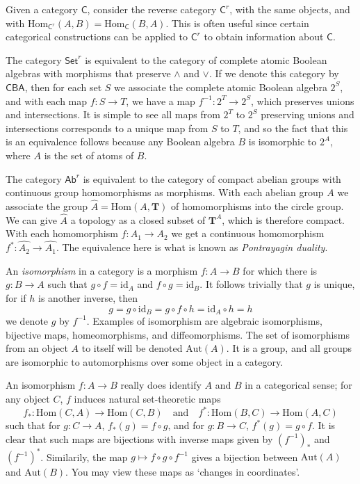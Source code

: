 Given a category $\mathsf{C}$, consider the reverse category $\mathsf{C}^{r}$, with the same objects, and with $\text{Hom}_{\mathsf{C}^r}(A,B) = \text{Hom}_{\mathsf{C}}(B,A)$. This is often useful since certain categorical constructions can be applied to $\mathsf{C}^r$ to obtain information about $\mathsf{C}$.

\begin{example}
    The category $\mathsf{Set}^r$ is equivalent to the category of complete atomic Boolean algebras with morphisms that preserve $\wedge$ and $\vee$. If we denote this category by $\mathsf{CBA}$, then for each set $S$ we associate the complete atomic Boolean algebra $2^S$, and with each map $f: S \to T$, we have a map $f^{-1}: 2^T \to 2^S$, which preserves unions and intersections. It is simple to see all maps from $2^T$ to $2^S$ preserving unions and intersections corresponds to a unique map from $S$ to $T$, and so the fact that this is an equivalence follows because any Boolean algebra $B$ is isomorphic to $2^A$, where $A$ is the set of atoms of $B$.
\end{example}

\begin{example}
    The category $\mathsf{Ab}^r$ is equivalent to the category of compact abelian groups with continuous group homomorphisms as morphisms. With each abelian group $A$ we associate the group $\widehat{A} = \text{Hom}(A,\mathbf{T})$ of homomorphisms into the circle group. We can give $\widehat{A}$ a topology as a closed subset of $\mathbf{T}^A$, which is therefore compact. With each homomorphism $f: A_1 \to A_2$ we get a continuous homomorphism $f^*: \widehat{A_2} \to \widehat{A_1}$. The equivalence here is what is known as \emph{Pontrayagin duality}.
\end{example}

An \emph{isomorphism} in a category is a morphism $f:A \to B$ for which there is $g: B \to A$ such that $g \circ f = \text{id}_A$ and $f \circ g = \text{id}_B$. It follows trivially that $g$ is unique, for if $h$ is another inverse, then
%
\[ g = g \circ \text{id}_B = g \circ f \circ h = \text{id}_A \circ h = h \]
%
we denote $g$ by $f^{-1}$. Examples of isomorphism are algebraic isomorphisms, bijective maps, homeomorphisms, and diffeomorphisms. The set of isomorphisms from an object $A$ to itself will be denoted $\text{Aut}(A)$. It is a group, and all groups are isomorphic to automorphisms over some object in a category.

An isomorphism $f: A \to B$ really does identify $A$ and $B$ in a categorical sense; for any object $C$, $f$ induces natural set-theoretic maps
%
\[ f_*: \text{Hom}(C,A) \to \text{Hom}(C,B) \quad\text{and}\quad f^*: \text{Hom}(B,C) \to \text{Hom}(A,C) \]
%
such that for $g: C \to A$, $f_*(g) = f \circ g$, and for $g: B \to C$, $f^*(g) = g \circ f$. It is clear that such maps are bijections with inverse maps given by $(f^{-1})_*$ and $(f^{-1})^*$. Similarily, the map $g \mapsto f \circ g \circ f^{-1}$ gives a bijection between $\text{Aut}(A)$ and $\text{Aut}(B)$. You may view these maps as `changes in coordinates'.

